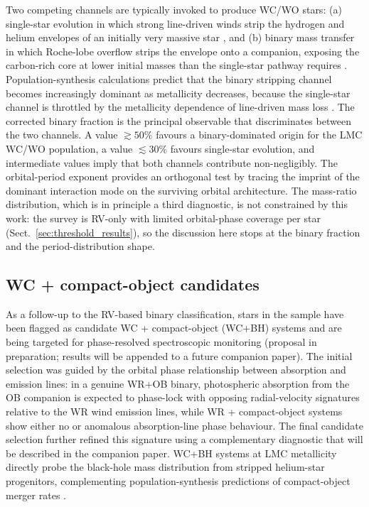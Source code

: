 Two competing channels are typically invoked to produce WC/WO stars: (a)
single-star evolution in which strong line-driven winds strip the
hydrogen and helium envelopes of an initially very massive star
\citep[the Conti scenario;][]{Conti1976}, and (b) binary mass transfer in
which Roche-lobe overflow strips the envelope onto a companion, exposing
the carbon-rich core at lower initial masses than the single-star
pathway requires \citep{Paczynski1967}.
Population-synthesis calculations predict that the binary stripping
channel becomes increasingly dominant as metallicity decreases, because
the single-star channel is throttled by the metallicity dependence of
line-driven mass loss \citep{Marchant2023}. The corrected binary fraction
\fbincorr is the principal observable that discriminates between the two
channels. A value $\gtrsim 50\%$ favours a binary-dominated origin for
the LMC WC/WO population, a value $\lesssim 30\%$ favours single-star
evolution, and intermediate values imply that both channels contribute
non-negligibly. The orbital-period exponent \pibestfit provides an
orthogonal test by tracing the imprint of the dominant interaction mode
on the surviving orbital architecture.
The mass-ratio distribution, which is in principle a third diagnostic,
is not constrained by this work: the survey is RV-only with limited
orbital-phase coverage per star (Sect.~\ref{sec:threshold_results}), so
the discussion here stops at the binary fraction and the
period-distribution shape.

\subsection{WC + compact-object candidates}
\label{sec:compact_objects}

As a follow-up to the RV-based binary classification, \NcandidateBH
stars in the sample have been flagged as candidate WC + compact-object
(WC+BH) systems and are being targeted for phase-resolved spectroscopic
monitoring (proposal in preparation; results will be appended to a
future companion paper). The initial selection was guided by the
orbital phase relationship between absorption and emission lines: in a
genuine WR+OB binary, photospheric absorption from the OB companion is
expected to phase-lock with opposing radial-velocity signatures
relative to the WR wind emission lines, while WR + compact-object
systems show either no or anomalous absorption-line phase behaviour.
The final candidate selection further refined this signature using a
complementary diagnostic that will be described in the companion paper.
WC+BH systems at LMC metallicity directly probe the black-hole mass
distribution from stripped helium-star progenitors, complementing
population-synthesis predictions of compact-object merger rates
\citep{vandenHeuvel2017}.
